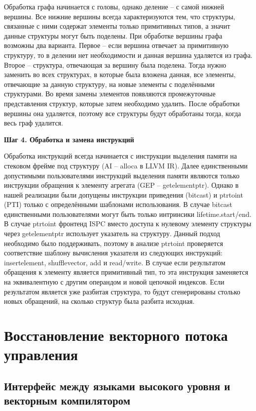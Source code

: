 Обработка графа начинается с головы, однако деление -- с самой нижней вершины.
Все нижние вершины всегда характеризуются тем, что структуры, связанные с ними содержат элементы только примитивных типов, а значит данные структуры могут быть поделены.
При обработке вершины графа возможны два варианта.
Первое -- если вершина отвечает за примитивную структуру, то в делении нет необходимости и данная вершина удаляется из графа.
Второе -- структура, отвечающая за вершину была поделена.
Тогда нужно заменить во всех структурах, в которые была вложена данная, все элементы, отвечающие за данную структуру, на новые элементы с поделёнными структурами.
Во время замены элементов появляются промежуточные представления структур, которые затем необходимо удалить.
После обработки вершины она удаляется, поэтому все структуры будут обработаны тогда, когда весь граф удалится.

\textbf{Шаг 4. Обработка и замена инструкций}

Обработка инструкций всегда начинается с инструкции выделения памяти на стековом фрейме под структуру (AI -- alloca в LLVM IR).
Далее единственными допустимыми пользователями инструкций выделения памяти являются только инструкции обращения к элементу агрегата (GEP -- getelementptr).
Однако в нашей реализации были допущены инструкции приведения (bitcast) и ptrtoint (PTI) только с определёнными шаблонами использования.
В случае bitcast единственными пользователями могут быть только интринсики lifetime.start/end.
В случае ptrtoint фронтенд ISPC вместо доступа к нулевому элементу структуры через getelementptr использует указатель на структуру.
Данный подход необходимо было поддерживать, поэтому в анализе ptrtoint проверяется соответствие шаблону вычисления указателя из следующих инструкций: insertelement, shufflevector, add и read/write.
В случае если результатом обращения к элементу является примитивный тип, то эта инструкция заменяется на эквивалентную с другим операндом и новой цепочкой индексов.
Если результатом является уже разбитая структура, то будут сгенерированы столько новых обращений, на сколько структур была разбита исходная.

\section{Восстановление векторного потока управления}\label{sec:lowering/simdcf}

\subsection{Интерфейс между языками высокого уровня и векторным компилятором}\label{sec:lowering/simdcf/intface}

